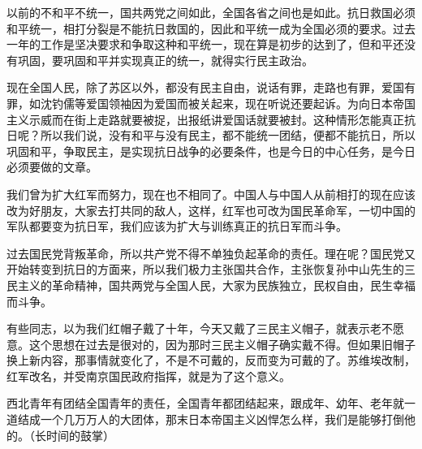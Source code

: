 以前的不和平不统一，国共两党之间如此，全国各省之间也是如此。抗日救国必须和平统一，相打分裂是不能抗日救国的，因此和平统一成为全国必须的要求。过去一年的工作是坚决要求和争取这种和平统一，现在算是初步的达到了，但和平还没有巩固，要巩固和平并实现真正的统一，就得实行民主政治。

现在全国人民，除了苏区以外，都没有民主自由，说话有罪，走路也有罪，爱国有罪，如沈钓儒等爱国领袖因为爱国而被关起来，现在听说还要起诉。为向日本帝国主义示威而在街上走路就要被捉，出报纸讲爱国话就要被封。这种情形怎能真正抗日呢？所以我们说，没有和平与没有民主，都不能统一团结，便都不能抗日，所以巩固和平，争取民主，是实现抗日战争的必要条件，也是今日的中心任务，是今日必须要做的文章。

我们曾为扩大红军而努力，现在也不相同了。中国人与中国人从前相打的现在应该改为好朋友，大家去打共同的敌人，这样，红军也可改为国民革命军，一切中国的军队都要变为抗日军，我们应该为扩大与训练真正的抗日军而斗争。

过去国民党背叛革命，所以共产党不得不单独负起革命的责任。理在呢？国民党又开始转变到抗日的方面来，所以我们极力主张国共合作，主张恢复孙中山先生的三民主义的革命精神，国共两党与全国人民，大家为民族独立，民权自由，民生幸福而斗争。

有些同志，以为我们红帽子戴了十年，今天又戴了三民主义帽子，就表示老不愿意。这个思想在过去是很对的，因为那时三民主义帽子确实戴不得。但如果旧帽子换上新内容，那事情就变化了，不是不可戴的，反而变为可戴的了。苏维埃改制，红军改名，并受南京国民政府指挥，就是为了这个意义。

西北青年有团结全国青年的责任，全国青年都团结起来，跟成年、幼年、老年就一道结成一个几万万人的大团体，那末日本帝国主义凶悍怎么样，我们是能够打倒他的。（长时间的鼓掌）

